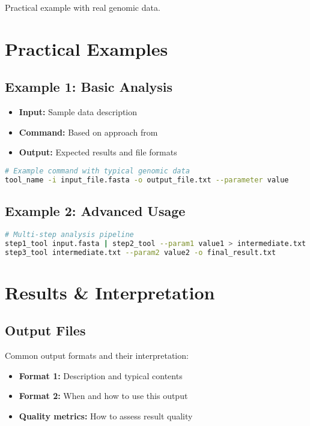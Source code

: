 \documentclass[a4paper,11pt]{article}
\begin{document}
\begin{example}
Practical example with real genomic data.
\end{example}

\section{Practical Examples}

\subsection{Example 1: Basic Analysis}

\begin{itemize}
    \item \textbf{Input:} Sample data description
    \item \textbf{Command:} Based on approach from \cite{example2024}
    \item \textbf{Output:} Expected results and file formats
\end{itemize}

\begin{lstlisting}[language=bash, caption=Basic command example]
# Example command with typical genomic data
tool_name -i input_file.fasta -o output_file.txt --parameter value
\end{lstlisting}

\subsection{Example 2: Advanced Usage}

\begin{lstlisting}[language=bash, caption=Advanced analysis pipeline]
# Multi-step analysis pipeline
step1_tool input.fasta | step2_tool --param1 value1 > intermediate.txt
step3_tool intermediate.txt --param2 value2 -o final_result.txt
\end{lstlisting}

\section{Results \& Interpretation}

\subsection{Output Files}

Common output formats and their interpretation:
\begin{itemize}
    \item \textbf{Format 1:} Description and typical contents
    \item \textbf{Format 2:} When and how to use this output
    \item \textbf{Quality metrics:} How to assess result quality
\end{itemize}
\end{document}
